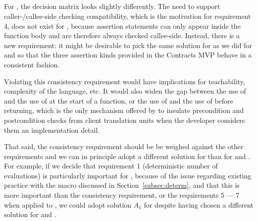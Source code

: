 \subsection{}
For , the decision matrix looks slightly differently. The need to support caller-/callee-side checking compatibility, which is the motivation for requirement 4, does not exist for , because assertion statements can only appear inside the function body and are therefore always checked callee-side. Instead, there is a new requirement: it might be desirable to pick the same solution for  as we did for  and  so that the three assertion kinds provided in the Contracts MVP behave in a consistent fashion.

Violating this consistency requirement would have implications for teachability, complexity of the language, etc. It would also widen the gap between the use of  and the use of  at the start
of a function, or the use of  and the use of  before returning, which is the only mechanism offered by \cite{P2900R6} to insulate precondition and postcondition checks from client translation units when the developer considers them an implementation detail.

That said, the consistency requirement should be be weighed against the other requirements and we can in principle adopt a different solution for   than for  and . For example, if we decide that requirement 1 (deterministic number of evaluations) is particularly important for , because of the issue regarding existing practice with the  macro discussed in Section~\ref{subsec:determ}, and that this is more important than the consistency requirement, or the requirements 5 --- 7 when applied to , we could adopt solution $A_1$ for  despite having chosen a different solution for  and .




